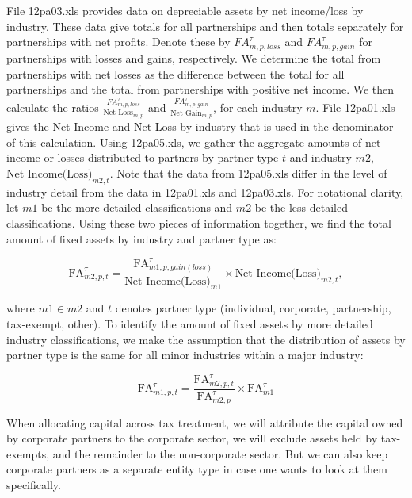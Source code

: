 \documentclass[article,11pt,letterpaper,fleqn]{article}
\theoremstyle{definition}
\numberwithin{equation}{section}
\begin{document}
File 12pa03.xls provides data on depreciable assets by net income/loss by industry.  These data give totals for all partnerships and then totals separately for partnerships with net profits.  Denote these by $FA^{\tau}_{m,p,loss}$ and $FA^{\tau}_{m,p,gain}$ for partnerships with losses and gains, respectively.  We determine the total from partnerships with net losses as the difference between the total for all partnerships and the total from partnerships with positive net income.  We then calculate the ratios $\frac{FA^{\tau}_{m,p,loss}}{\text{Net Loss}_{m,p}}$ and $\frac{FA^{\tau}_{m,p,gain}}{\text{Net Gain}_{m,p}}$, for each industry $m$.  File 12pa01.xls gives the Net Income and Net Loss by industry that is used in the denominator of this calculation.  Using 12pa05.xls, we gather the aggregate amounts of net income or losses distributed to partners by partner type $t$ and industry $m2$, $\text{Net Income(Loss)}_{m2,t}$.  Note that the data from 12pa05.xls differ in the level of industry detail from the data in 12pa01.xls and 12pa03.xls.  For notational clarity, let $m1$ be the more detailed classifications and $m2$ be the less detailed classifications.  Using these two pieces of information together, we find the total amount of fixed assets by industry and partner type as:  

\begin{equation}
\text{FA}^{\tau}_{m2,p,t}=  \frac{\text{FA}^{\tau}_{m1,p,gain(loss)}}{\text{Net Income(Loss)}_{m1}} \times \text{Net Income(Loss)}_{m2,t},
\end{equation}

\noindent\noindent where $m1\in m2$ and $t$ denotes partner type (individual, corporate, partnership, tax-exempt, other).  To identify the amount of fixed assets by more detailed industry classifications, we make the assumption that the distribution of assets by partner type is the same for all minor industries within a major industry:

\begin{equation}
\text{FA}^{\tau}_{m1,p,t}=  \frac{\text{FA}^{\tau}_{m2,p,t}}{\text{FA}^{\tau}_{m2,p}} \times \text{FA}^{\tau}_{m1}
\end{equation}

When allocating capital across tax treatment, we will attribute the capital owned by corporate partners to the corporate sector, we will exclude assets held by tax-exempts, and the remainder to the non-corporate sector.  But we can also keep corporate partners as a separate entity type in case one wants to look at them specifically.
\end{document}
